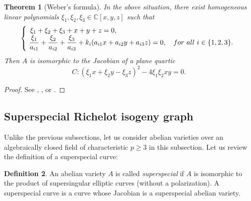 \documentclass{amsart}
\theoremstyle{definition}
\newtheorem{Def}{Definition}[section]
\theoremstyle{plain}
\newtheorem{Thm}[Def]{Theorem}
\begin{document}
\begin{Thm}[Weber's formula]\label{Weber}
In the above situation, there exist homogeneous linear polynomials $\xi_1,\xi_2,\xi_3 \in \mathbb{C}[x,y,z]$ such that
\[
    \left\{
    \begin{array}{l}
        \xi_1+\xi_2+\xi_3+x+y+z = 0,\\
        \!\displaystyle\frac{\xi_1}{a_{i1}} + \frac{\xi_2}{a_{i2}} + \frac{\xi_3}{a_{i3}} + k_i(a_{i1}x + a_{i2}y + a_{i3}z) = 0, \quad {\rm for\ all}\ i \in \{1,2,3\}.
    \end{array}
    \right.
\]
Then $A$ is isomorphic to the Jacobian of a plane quartic
\[
    C: (\xi_1x + \xi_2y - \xi_3z)^2 - 4\xi_1\xi_2xy = 0.
\]
\end{Thm}
\begin{proof}
See \cite[$\S 15$]{Weber}, \cite[Theorem 3.1]{NR}, or \cite[Proposition 2]{Fiorentino}.
\end{proof}

\subsection{Superspecial Richelot isogeny graph}\label{graph}
Unlike the previous subsections, let us consider abelian varieties over an algebraically closed field of characteristic $p \geq 3$ in this subsection.
Let us review the definition of a superspecial curve:
\begin{Def}
An abelian variety $A$ is called \emph{superspecial} if $A$ is isomorphic to the product of supersingular elliptic curves (without a polarization).
A superspecial curve is a curve whose Jacobian is a superspecial abelian variety.
\end{Def}
\end{document}
